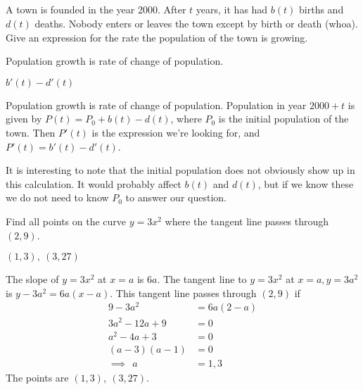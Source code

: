 \subsection*{\Application}

\begin{Mquestion}A town is founded in the year 2000. After $t$ years, it has had $b(t)$ births and $d(t)$ deaths. Nobody enters or leaves the town except by birth or death (whoa). Give an expression for the rate the population of the town is growing.
\end{Mquestion}
\begin{hint} Population growth is rate of change of population.
\end{hint}
\begin{answer} $b'(t)-d'(t)$
\end{answer}
\begin{solution} Population growth is rate of change of population.
Population in year $2000+t$ is given by $P(t)=P_0+b(t)-d(t)$, where $P_0$ is the initial population of the town. Then $P'(t)$ is the expression we're looking for, and $P'(t)=b'(t)-d'(t)$.

It is interesting to note that the initial population does not obviously show up in this calculation. It would probably affect $b(t)$ and $d(t)$, but if we know these we do not need to know $P_0$ to answer our question.
\end{solution}


\begin{question}[1997D]Find all points on the curve $y=3x^2$ where the tangent
line passes through $(2,9)$.
\end{question}
\begin{answer}{$(1,3),\ (3,27)$}
\end{answer}
\begin{solution}
The slope of $y=3x^2$ at $x=a$ is $6a$. The tangent line to
$y=3x^2$ at $x=a, y=3a^2$ is $y-3a^2=6a(x-a)$. This tangent line passes
through $(2,9)$ if
\begin{align*}
9-3a^2&=6a(2-a)\\
 3a^2-12a+9&=0\\
  a^2-4a+3&=0\\
  (a-3)(a-1)&=0\\
\implies~~a&=1,3
\end{align*}
The points are {$(1,3),\ (3,27)$}.
\end{solution}

